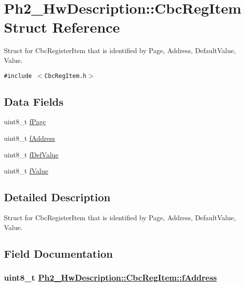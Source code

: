 \hypertarget{struct_ph2___hw_description_1_1_cbc_reg_item}{
\section{Ph2\_\-Hw\-Description::Cbc\-Reg\-Item Struct Reference}
\label{struct_ph2___hw_description_1_1_cbc_reg_item}
}
Struct for Cbc\-Register\-Item that is identified by Page, Address, Default\-Value, Value.  


{\tt \#include $<$Cbc\-Reg\-Item.h$>$}

\subsection*{Data Fields}
\begin{CompactItemize}
\item 
uint8\_\-t \hyperlink{struct_ph2___hw_description_1_1_cbc_reg_item_082fb29397d4a4e2ccbf4563c1385e6e}{f\-Page}
\item 
uint8\_\-t \hyperlink{struct_ph2___hw_description_1_1_cbc_reg_item_67f6d52003832c42c7747f304d50a87d}{f\-Address}
\item 
uint8\_\-t \hyperlink{struct_ph2___hw_description_1_1_cbc_reg_item_7c958bb4e0cd79891f3d3a191ef2f749}{f\-Def\-Value}
\item 
uint8\_\-t \hyperlink{struct_ph2___hw_description_1_1_cbc_reg_item_1fa052a53215cbee674174febcc52b6a}{f\-Value}
\end{CompactItemize}


\subsection{Detailed Description}
Struct for Cbc\-Register\-Item that is identified by Page, Address, Default\-Value, Value. 



\subsection{Field Documentation}
\hypertarget{struct_ph2___hw_description_1_1_cbc_reg_item_67f6d52003832c42c7747f304d50a87d}{
\subsubsection[fAddress]{\setlength{\rightskip}{0pt plus 5cm}uint8\_\-t \hyperlink{struct_ph2___hw_description_1_1_cbc_reg_item_67f6d52003832c42c7747f304d50a87d}{Ph2\_\-Hw\-Description::Cbc\-Reg\-Item::f\-Address}}}
\label{struct_ph2___hw_description_1_1_cbc_reg_item_67f6d52003832c42c7747f304d50a87d}


